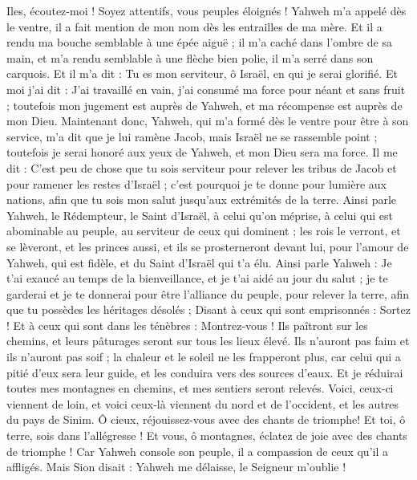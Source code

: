\begin{multicols}{2}
\VerseOne{}Iles, écoutez-moi ! Soyez attentifs, vous peuples éloignés ! Yahweh m'a appelé dès le ventre, il a fait mention de mon nom dès les entrailles de ma mère.
Et il a rendu ma bouche semblable à une épée aiguë ; il m'a caché dans l'ombre de sa main, et m'a rendu semblable à une flèche bien polie, il m'a serré dans son carquois.
Et il m'a dit : Tu es mon serviteur, ô Israël, en qui je serai glorifié.
Et moi j'ai dit : J'ai travaillé en vain, j'ai consumé ma force pour néant et sans fruit ; toutefois mon jugement est auprès de Yahweh, et ma récompense est auprès de mon Dieu.
Maintenant donc, Yahweh, qui m'a formé dès le ventre pour être à son service, m'a dit que je lui ramène Jacob, mais Israël ne se rassemble point ; toutefois je serai honoré aux yeux de Yahweh, et mon Dieu sera ma force.
Il me dit : C'est peu de chose que tu sois serviteur pour relever les tribus de Jacob et pour ramener les restes d'Israël ; c'est pourquoi je te donne pour lumière aux nations, afin que tu sois mon salut jusqu'aux extrémités de la terre.
Ainsi parle Yahweh, le Rédempteur, le Saint d'Israël, à celui qu'on méprise, à celui qui est abominable au peuple, au serviteur de ceux qui dominent ; les rois le verront, et se lèveront, et les princes aussi, et ils se prosterneront devant lui, pour l'amour de Yahweh, qui est fidèle, et du Saint d'Israël qui t'a élu.
Ainsi parle Yahweh : Je t'ai exaucé au temps de la bienveillance, et je t'ai aidé au jour du salut ; je te garderai et je te donnerai pour être l'alliance du peuple, pour relever la terre, afin que tu possèdes les héritages désolés ;
Disant à ceux qui sont emprisonnés : Sortez ! Et à ceux qui sont dans les ténèbres : Montrez-vous ! Ils paîtront sur les chemins, et leurs pâturages seront sur tous les lieux élevé.
Ils n'auront pas faim et ils n'auront pas soif ; la chaleur et le soleil ne les frapperont plus, car celui qui a pitié d'eux sera leur guide, et les conduira vers des sources d'eaux.
Et je réduirai toutes mes montagnes en chemins, et mes sentiers seront relevés.
Voici, ceux-ci viennent de loin, et voici ceux-là viennent du nord et de l'occident, et les autres du pays de Sinim.
Ô cieux, réjouissez-vous avec des chants de triomphe! Et toi, ô terre, sois dans l'allégresse ! Et vous, ô montagnes, éclatez de joie avec des chants de triomphe ! Car Yahweh console son peuple, il a compassion de ceux qu'il a affligés.
Mais Sion disait : Yahweh me délaisse, le Seigneur m'oublie !

\end{multicols}
